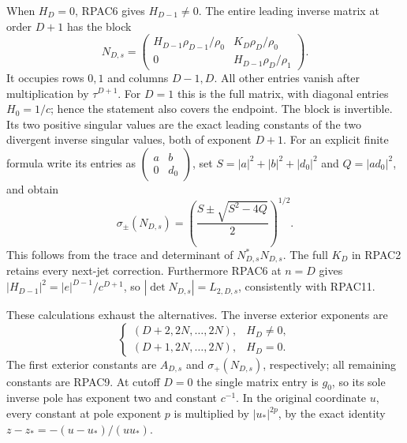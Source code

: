 When $H_D=0$, RPAC6 gives $H_{D-1}\ne0$. The entire leading
inverse matrix at order $D+1$ has the block
\[
 N_{D,s}=\begin{pmatrix}
 H_{D-1}\rho_{D-1}/\rho_0&K_D\rho_D/\rho_0\\
 0&H_{D-1}\rho_D/\rho_1
 \end{pmatrix}.\tag{RPAC13}
\]
It occupies rows $0,1$ and columns $D-1,D$.
All other entries vanish after multiplication by $\tau^{D+1}$.
For $D=1$ this is the full matrix, with diagonal entries
$H_0=1/c$; hence the statement also covers the endpoint.
The block is invertible. Its two positive singular values are
the exact leading constants of the two divergent inverse
singular values, both of exponent $D+1$.
For an explicit finite formula write its entries as
$\left(\begin{smallmatrix}a&b\\0&d_0\end{smallmatrix}\right)$,
set $S=|a|^2+|b|^2+|d_0|^2$ and $Q=|ad_0|^2$, and obtain
\[
 \sigma_\pm(N_{D,s})=
   \left(\frac{S\pm\sqrt{S^2-4Q}}2\right)^{1/2}.
 \tag{RPAC14}
\]
This follows from the trace and determinant of $N_{D,s}^*N_{D,s}$.
The full $K_D$ in RPAC2 retains every next-jet correction.
Furthermore RPAC6 at $n=D$ gives
$|H_{D-1}|^2=|e|^{D-1}/c^{D+1}$, so
$|\det N_{D,s}|=L_{2,D,s}$, consistently with RPAC11.

These calculations exhaust the alternatives. The inverse exterior
exponents are
\[
 \begin{cases}
 (D+2,2N,\ldots,2N),&H_D\ne0,\\
 (D+1,2N,\ldots,2N),&H_D=0.
 \end{cases}
\]
The first exterior constants are
$A_{D,s}$ and $\sigma_+(N_{D,s})$, respectively; all remaining
constants are RPAC9. At cutoff $D=0$ the single matrix entry is
$g_0$, so its sole inverse pole has exponent two and constant
$c^{-1}$. In the original coordinate $u$, every constant at pole
exponent $p$ is multiplied by $|u_*|^{2p}$, by the exact identity
$z-z_*=-(u-u_*)/(uu_*)$.

